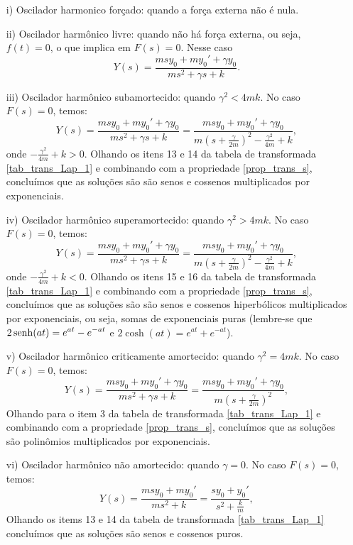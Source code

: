 \begin{itemize}
 \item[i)] Oscilador harmonico forçado: quando a força externa não é nula.
 \item[ii)] Oscilador harmônico livre: quando não há força externa, ou seja, $f(t)=0$, o que implica em $F(s)=0$. Nesse caso
$$
Y(s)=\frac{msy_0+my_0'+\gamma y_0}{ms^2+\gamma s +k}.
$$
\item[iii)] Oscilador harmônico subamortecido: quando $\gamma^2< 4mk$. No caso $F(s)=0$, temos:
$$
Y(s)=\frac{msy_0+my_0'+\gamma y_0}{ms^2+\gamma s +k}=\frac{msy_0+my_0'+\gamma y_0}{m\left(s+\frac{\gamma}{2m}\right)^2-\frac{\gamma^2}{4m} +k},
$$
onde $-\frac{\gamma^2}{4m} +k>0$. Olhando os itens 13 e 14 da tabela de transformada \ref{tab_trans_Lap_1} e combinando com a propriedade \ref{prop_trans_s}, concluímos que as soluções são são senos e cossenos multiplicados por exponenciais.
\item[iv)] Oscilador harmônico superamortecido: quando $\gamma^2> 4mk$. No caso $F(s)=0$, temos:
$$
Y(s)=\frac{msy_0+my_0'+\gamma y_0}{ms^2+\gamma s +k}=\frac{msy_0+my_0'+\gamma y_0}{m\left(s+\frac{\gamma}{2m}\right)^2-\frac{\gamma^2}{4m} +k},
$$
onde $-\frac{\gamma^2}{4m} +k<0$. Olhando os itens 15 e 16 da tabela de transformada \ref{tab_trans_Lap_1} e combinando com a propriedade \ref{prop_trans_s}, concluímos que as soluções são são senos e cossenos hiperbólicos multiplicados por exponenciais, ou seja, somas de exponenciais puras (lembre-se que $\displaystyle 2\operatorname{senh}(at)=e^{at}-e^{-at}$ e $\displaystyle2\cosh(at)=e^{at}+e^{-at}$).
\item[v)] Oscilador harmônico criticamente amortecido: quando $\gamma^2= 4mk$. No caso $F(s)=0$, temos:
$$
Y(s)=\frac{msy_0+my_0'+\gamma y_0}{ms^2+\gamma s +k}=\frac{msy_0+my_0'+\gamma y_0}{m\left(s+\frac{\gamma}{2m}\right)^2},
$$
Olhando para o item 3 da tabela de transformada \ref{tab_trans_Lap_1} e combinando com a propriedade \ref{prop_trans_s}, concluímos que as soluções são polinômios multiplicados por exponenciais.
\item[vi)] Oscilador harmônico não amortecido: quando $\gamma= 0$. No caso $F(s)=0$, temos:
$$
Y(s)=\frac{msy_0+my_0'}{ms^2 +k}=\frac{sy_0+y_0'}{s^2+\frac{k}{m}},
$$
Olhando os items 13 e 14 da tabela de transformada \ref{tab_trans_Lap_1} concluímos que as soluções são senos e cossenos puros.

\end{itemize}


